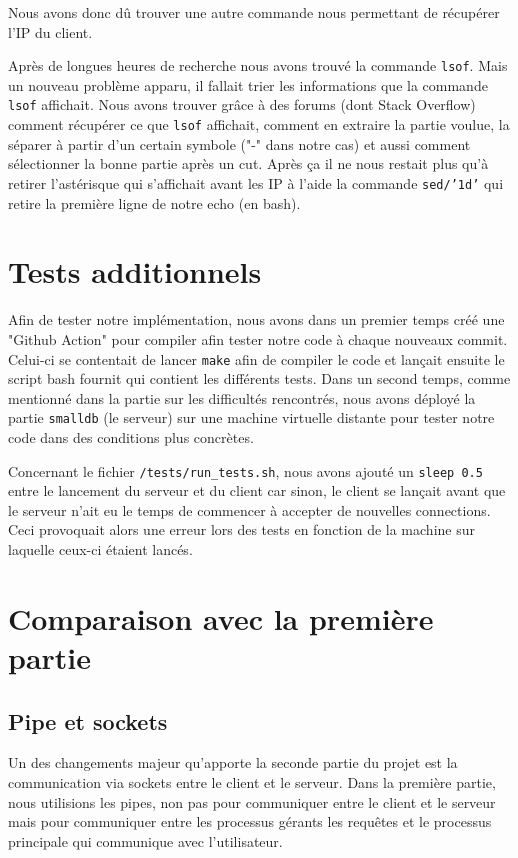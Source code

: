 \documentclass[utf8]{article}
\begin{document}
Nous avons donc dû trouver une autre commande nous permettant de récupérer l'IP du client.

Après de longues heures de recherche nous avons trouvé la commande \texttt{lsof}. Mais un nouveau problème apparu, il fallait trier les informations que la commande \texttt{lsof} affichait. Nous avons trouver grâce à des forums (dont Stack Overflow) comment récupérer ce que \texttt{lsof} affichait, comment en extraire la partie voulue, la séparer à partir d'un certain symbole ("-" dans notre cas) et aussi comment sélectionner la bonne partie après un cut. Après ça il ne nous restait plus qu'à retirer l'astérisque qui s'affichait avant les IP à l'aide la commande \texttt{sed/'1d'} qui retire la première ligne de notre echo (en bash).

\section{Tests additionnels}

Afin de tester notre implémentation, nous avons dans un premier temps créé une "Github Action" pour compiler afin tester notre code à chaque nouveaux commit. Celui-ci se contentait de lancer \texttt{make} afin de compiler le code et lançait ensuite le script bash fournit qui contient les différents tests. Dans un second temps, comme mentionné dans la partie sur les difficultés rencontrés, nous avons déployé la partie \texttt{smalldb} (le serveur) sur une machine virtuelle distante pour tester notre code dans des conditions plus concrètes.

Concernant le fichier \texttt{/tests/run\_tests.sh}, nous avons ajouté un \texttt{sleep 0.5} entre le lancement du serveur et du client car sinon, le client se lançait avant que le serveur n'ait eu le temps de commencer à accepter de nouvelles connections. Ceci provoquait alors une erreur lors des tests en fonction de la machine sur laquelle ceux-ci étaient lancés.

\section{Comparaison avec la première partie}

\subsection{Pipe et sockets}

Un des changements majeur qu'apporte la seconde partie du projet est la communication via sockets entre le client et le serveur. Dans la première partie, nous utilisions les pipes, non pas pour communiquer entre le client et le serveur mais pour communiquer entre les processus gérants les requêtes et le processus principale qui communique avec l'utilisateur.
\end{document}
